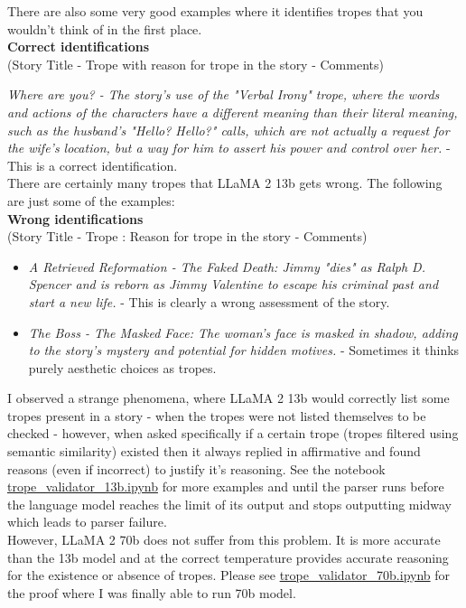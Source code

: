 \documentclass[11pt]{article}
\begin{document}
There are also some very good examples where it identifies tropes that you wouldn't think of in the first place.\\
\textbf{Correct identifications}\\
(Story Title - Trope with reason for trope in the story - Comments)

\textit{Where are you? - The story's use of the "Verbal Irony" trope, where the words and actions of the characters have a different meaning than their literal meaning, such as the husband's "Hello? Hello?" calls, which are not actually a request for the wife's location, but a way for him to assert his power and control over her.} - This is a correct identification.
\\
There are certainly many tropes that LLaMA 2 13b gets wrong. The following are just some of the examples:
\\
\textbf{Wrong identifications}\\
(Story Title - Trope : Reason for trope in the story - Comments)
\begin{itemize}
  \item \textit{A Retrieved Reformation - The Faked Death: Jimmy "dies" as Ralph D. Spencer and is reborn as Jimmy Valentine to escape his criminal past and start a new life.} - This is clearly a wrong assessment of the story.
  \item \textit{The Boss - The Masked Face: The woman's face is masked in shadow, adding to the story's mystery and potential for hidden motives.} - Sometimes it thinks purely aesthetic choices as tropes.
\end{itemize}
I observed a strange phenomena, where LLaMA 2 13b would correctly list some tropes present in a story - when the tropes were not listed themselves to be checked - however, when asked specifically if a certain trope (tropes filtered using semantic similarity) existed then it always replied in affirmative and found reasons (even if incorrect) to justify it's reasoning. 
See the notebook \href{https://github.com/armsp/trama/blob/main/trope_validator_13b.ipynb}{trope\_validator\_13b.ipynb} for more examples and until the parser runs before the language model reaches the limit of its output and stops outputting midway which leads to parser failure.\\
However, LLaMA 2 70b does not suffer from this problem. It is more accurate than the 13b model and at the correct temperature provides accurate reasoning for the existence or absence of tropes. Please see \href{https://github.com/armsp/trama/blob/main/trope_validator_70b.ipynb}{trope\_validator\_70b.ipynb} for the proof where I was finally able to run 70b model.
\end{document}
